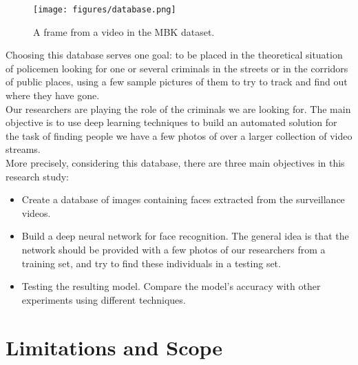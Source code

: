 \begin{figure}[t]
  \centering
  \texttt{[image: figures/database.png]}  
  \caption[A frame from a video in the MBK dataset.]{A frame from a video in the MBK dataset.}
  \label{fig:example}
\end{figure}

Choosing this database serves one goal: to be placed in the theoretical situation of policemen looking for one or several criminals in the streets or in the corridors of public places, using a few sample pictures of them to try to track and find out where they have gone.\\

Our researchers are playing the role of the criminals we are looking for.
The main objective is to use deep learning techniques to build an automated solution for the task of finding people we have a few photos of over a larger collection of video streams.\\

More precisely, considering this database, there are three main objectives in this research study:
\begin{itemize}
\item Create a database of images containing faces extracted from the surveillance videos.
\item Build a deep neural network for face recognition. The general idea is that the network should be provided with a few photos of our researchers from a training set, and try to find these individuals in a testing set.
\item Testing the resulting model. Compare the model's accuracy with other experiments using different techniques.
\end{itemize}

\section{Limitations and Scope}

